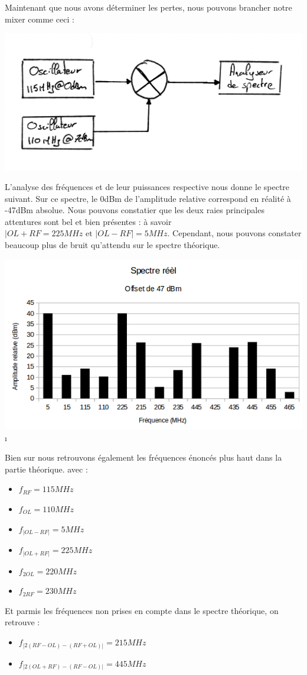 \documentclass[a4paper,12pt]{report}            %
\begin{document}
    Maintenant que nous avons déterminer les pertes, nous pouvons brancher notre mixer
comme ceci :
\begin{center}\includegraphics[scale = 0.2]{pic/cablage.png}\\ \end{center}


    L'analyse des fréquences et de leur puissances respective nous donne le spectre suivant.
Sur ce spectre, le 0dBm de l'amplitude relative correspond en réalité à -47dBm absolue. Nous 
pouvons constatier que les deux raies principales attentures sont bel et bien présentes :
à savoir $|OL+RF = 225 MHz \mbox{ et } |OL-RF| = 5 MHz$. Cependant, nous pouvons constater 
beaucoup plus de bruit qu'attendu sur le spectre théorique.
\begin{center}\includegraphics[scale = 0.7]{pic/spectre_reel.png}\i\ \end{center}


    Bien sur nous retrouvons également les fréquences énoncés plus haut dans la partie théorique.
avec :
\begin{itemize}
    \item $f_{RF} = 115 MHz$
    \item $f_{OL} = 110 MHz$ 
    \item $f_{|OL-RF|} = 5 MHz$
    \item $f_{|OL+RF|} = 225 MHz$
    \item $f_{2OL} = 220 MHz$
    \item $f_{2RF} = 230 MHz$
\end{itemize}
Et parmis les fréquences non prises en compte dans le spectre théorique, on retrouve :
\begin{itemize}
    \item $f_{|2(RF-OL)-(RF+OL)|} = 215 MHz$
    \item $f_{|2(OL+RF)-(RF-OL)|} = 445 MHz$ 
\end{itemize}
\end{document}
